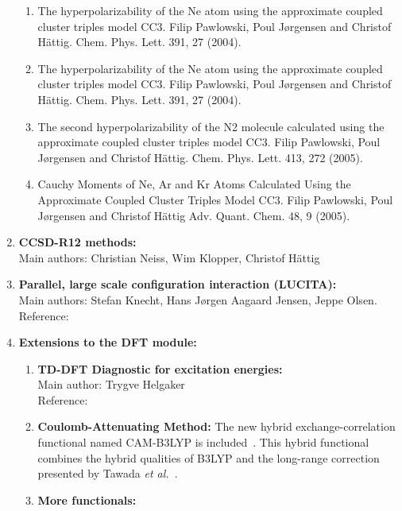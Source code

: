 \begin{enumerate}
\begin{enumerate}
\item	The hyperpolarizability of the Ne atom using the approximate
coupled cluster triples model CC3.
Filip Pawlowski, Poul J\o rgensen and Christof H\"{a}ttig.
Chem. Phys. Lett. 391, 27 (2004).

\item	The hyperpolarizability of the Ne atom using the approximate
coupled cluster triples model CC3.
Filip Pawlowski, Poul J\o rgensen and Christof H\"{a}ttig.
Chem. Phys. Lett. 391, 27 (2004).

\item	The second hyperpolarizability of the N2 molecule calculated using
the approximate coupled cluster triples model CC3.
Filip Pawlowski, Poul J\o rgensen and Christof H\"{a}ttig.
Chem. Phys. Lett. 413, 272 (2005).

\item	Cauchy Moments of Ne, Ar and Kr Atoms Calculated Using the
Approximate Coupled Cluster Triples Model CC3.
Filip Pawlowski, Poul J\o rgensen and Christof H\"{a}ttig
Adv. Quant. Chem. 48, 9 (2005).
\end{enumerate}


\item{\bf CCSD-R12 methods:} \\
Main authors: Christian Neiss, Wim Klopper, Christof H\"{a}ttig

\item{\bf Parallel, large scale configuration interaction (LUCITA):} \\
Main authors: Stefan Knecht, Hans J\o rgen Aagaard Jensen, Jeppe Olsen.\\
Reference: 
\cite{knecht08}

\item{\bf Extensions to the DFT module:}
\begin{enumerate}
  \item{\bf TD-DFT Diagnostic for excitation energies:}  \\
   Main author: Trygve Helgaker \\
   Reference: \cite{mjgppbthdjtjcp128}
  \item{\bf Coulomb-Attenuating Method:} The new hybrid
    exchange-correlation functional named CAM-B3LYP is
    included~\cite{tydptnchcpl393}. This hybrid functional  combines the
    hybrid qualities of B3LYP and the long-range correction presented by
    Tawada {\it et al.\/}~\cite{ytttsytykhjcp120}.
  \item{\bf More functionals:}
\end{enumerate}


\end{enumerate}
